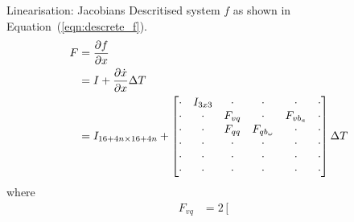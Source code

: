\documentclass[]{article}
\begin{document}
{Linearisation: Jacobians
Descritised system $f$ as shown in Equation~(\ref{eqn:descrete_f}).
\begin{align}
	F &= \frac{\partial f}{\partial x} \notag \\
	&=
	I + \frac{\partial \dot{x}}{\partial x} \Delta T \notag \\
	&=
	I_{16+4n \times 16+4n} +
	\left[
	\begin{matrix}
		\cdot 		& I_{3x3} 	& \cdot	 	& \cdot		 	& \cdot		& \cdot \\
		\cdot		& \cdot	 	& F_{vq}	& \cdot		 	& F_{vb_a} 	& \cdot \\
		\cdot		& \cdot	 	& F_{qq}	& F_{qb_\omega}	& \cdot		& \cdot \\
		\cdot		& \cdot		& \cdot	 	& \cdot		 	& \cdot		& \cdot \\
		\cdot		& \cdot		& \cdot	 	& \cdot			& \cdot		& \cdot \\
		\cdot		& \cdot		& \cdot	 	& \cdot			& \cdot		& \cdot
	\end{matrix}
	\right]
	\Delta T
	\label{eqn:F}
\end{align}
where
\begin{align}
	F_{vq} 	&= 2
	\left[
	\begin{matrix}

\end{matrix}
\end{align}}
\end{document}
